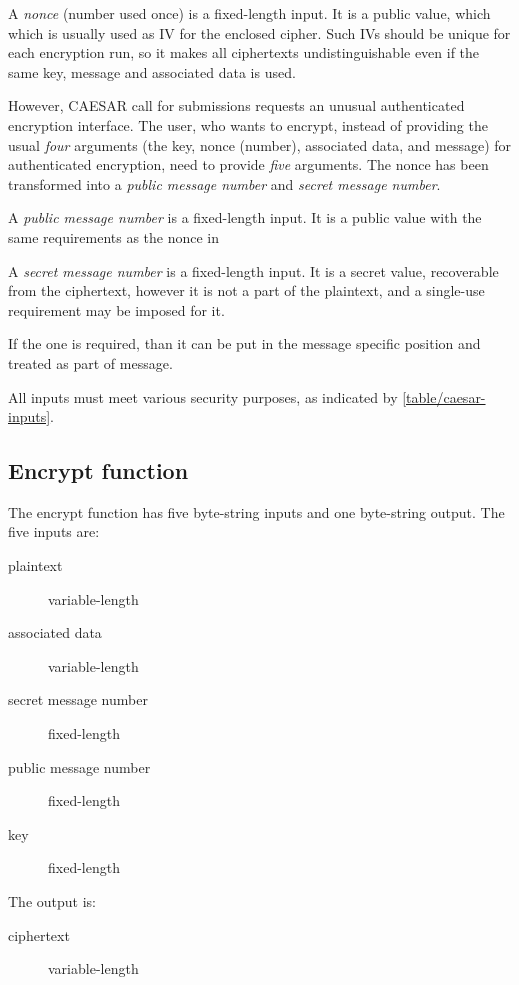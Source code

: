 A \textit{nonce} (number used once) is a fixed-length input. It is a public value, which which is usually used as IV for the enclosed cipher. Such IVs should be unique for each encryption run, so it makes all ciphertexts undistinguishable even if the same key, message and associated data is used.

However, CAESAR call for submissions requests an unusual authenticated encryption interface. The user, who wants to encrypt, instead of providing the usual \textit{four} arguments (the key, nonce (number), associated data, and message) for authenticated encryption, need to provide \textit{five} arguments. The nonce has been transformed into a \textit{public message number} and \textit{secret message number}. \cite{cryptoeprint:2013:242}

A \textit{public message number} is a fixed-length input. It is a public value with the same requirements as the nonce in

A \textit{secret message number} is a fixed-length input. It is a secret value, recoverable from the ciphertext, however it is not a part of the plaintext, and a single-use requirement may be imposed for it.

If the one is required, than it can be put in the message specific position and treated as part of message.

All inputs must meet various security purposes, as indicated by \autoref{table/caesar-inputs}.


\subsection{Encrypt function}

The encrypt function has five byte-string inputs and one byte-string output. The five inputs are:

\begin{description}
  \item[plaintext] variable-length
  \item[associated data] variable-length
  \item[secret message number] fixed-length
  \item[public message number] fixed-length
  \item[key] fixed-length
\end{description}

The output is:

\begin{description}
  \item[ciphertext] variable-length
\end{description}


